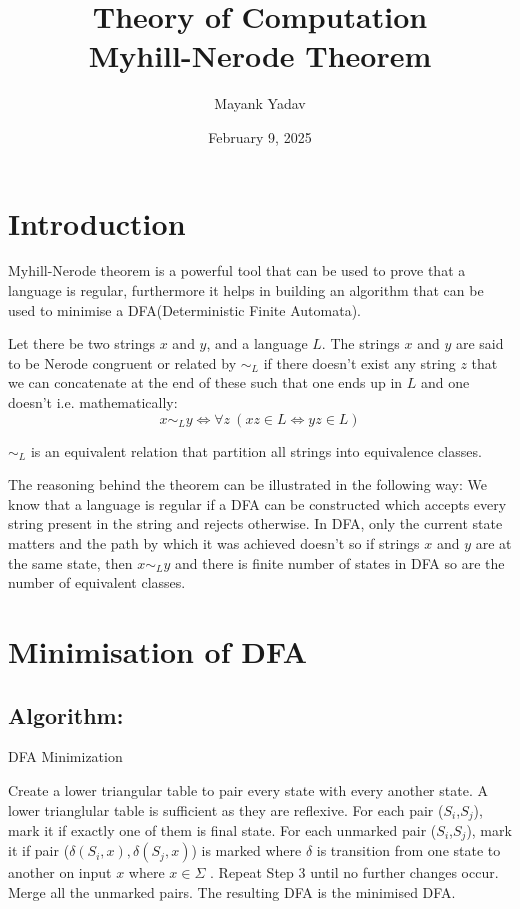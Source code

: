 \documentclass{article}
\title{\large Theory of Computation \\ \LARGE Myhill-Nerode Theorem}
\author{Mayank Yadav}
\date{February 9, 2025}
\begin{document}
\maketitle


\section{Introduction}
Myhill-Nerode theorem is a powerful tool that can be used to prove that a language is regular, furthermore it helps in building an algorithm that can be used to minimise a DFA(Deterministic Finite Automata). 

Let there be two strings $x$ and $y$, and a language $L$. The strings $x$ and $y$ are said to be Nerode congruent or related by $\sim_L$ if there doesn't exist any string $z$ that we can concatenate at the end of these such that one ends up in $L$ and one doesn't i.e. mathematically:
$$x \sim_L y \iff \forall z \ (xz \in L \iff yz \in L)$$

$\sim_L$ is an equivalent relation that partition all strings into equivalence classes.

\begin{center}
\end{center}
The reasoning behind the theorem can be illustrated in the following way:
We know that a language is regular if a DFA can be constructed which accepts every string present in the string and rejects otherwise. In DFA, only the current state matters and the path by which it was achieved doesn't so if strings $x$ and $y$ are at the same state, then $x \sim_L y$ and there is finite number of states in DFA so are the number of equivalent classes.

\section{Minimisation of DFA}

\subsection{Algorithm:}

\begin{algorithm}
\renewcommand{\thealgorithm}{}
\caption{DFA Minimization}\label{alg:cap}
\begin{algorithmic}[1]
    \State Create a lower triangular table to pair every state with every another state. A lower trianglular table is sufficient as they are reflexive.
    \State For each pair ($S_i$,$S_j$), mark it if exactly one of them is final state.
    \State For each unmarked pair ($S_i$,$S_j$), mark it if pair ($\delta(S_i,x),\delta(S_j,x)$) is marked where $\delta$ is transition from one state to another on input $x$ where $x\in \Sigma$ .
    \State Repeat Step 3 until no further changes occur.
    \State Merge all the unmarked pairs. The resulting DFA is the minimised DFA.
\end{algorithmic}
\end{algorithm}
\end{document}
